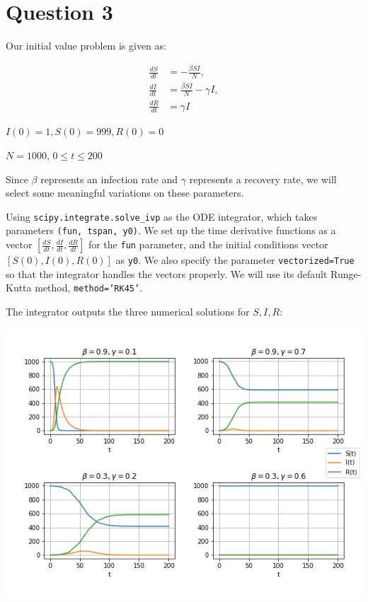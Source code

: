 \documentclass{article}
\begin{document}
\section*{Question 3}

Our initial value problem is given as:

\begin{align}
    \frac{dS}{dt} &= -\frac{\beta S I}{N},\\
    \frac{dI}{dt} &= \frac{\beta S I}{N} - \gamma I,\\
    \frac{dR}{dt} &= \gamma I
\end{align}

$I(0) = 1, S(0)=999, R(0) = 0$

$N=1000$, $0\leq t \leq 200$

Since $\beta$ represents an infection rate and $\gamma$ represents a recovery rate, we will select some meaningful variations on these parameters.

Using \texttt{scipy.integrate.solve\_ivp} as the ODE integrator, which takes parameters \texttt{(fun, tspan, y0)}. We set up the time derivative functions as a vector $[\frac{dS}{dt},\frac{dI}{dt},\frac{dR}{dt}]$ for the \texttt{fun} parameter, and the initial conditions vector $[S(0), I(0), R(0)]$ as \texttt{y0}. We also specify the parameter \texttt{vectorized=True} so that the integrator handles the vectors properly. We will use its default Runge-Kutta method, \texttt{method='RK45'}.
	
The integrator outputs the three numerical solutions for $S, I, R$:

\includegraphics[scale=0.75]{plot3}
\end{document}
